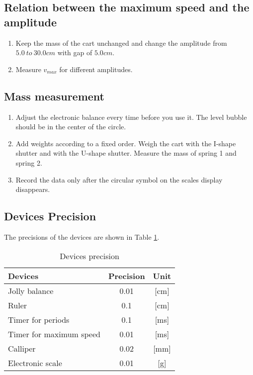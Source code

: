 \subsection{Relation between the maximum speed and the amplitude}
    \begin{enumerate}
        \item Keep the mass of the cart unchanged and change the amplitude from $5.0\ to\ 30.0 cm$ with gap of $5.0cm$.
        \item Measure $v_{max}$ for different amplitudes.
    \end{enumerate}

\subsection{Mass measurement}
    \begin{enumerate}
        \item Adjust the electronic balance every time before you use it. The level bubble should be in the center of the circle.
        \item Add weights according to a fixed order. Weigh the cart with the I-shape shutter and with the U-shape shutter. Measure the mass of spring 1 and spring 2.
        \item Record the data only after the circular symbol on the scales display disappears.
    \end{enumerate}

\subsection{Devices Precision}
    The precisions of the devices are shown in Table \ref{precision}.
    \begin{table}
        \centering
        \begin{tabular}{|l|c|c|}
            \hline
            Devices & Precision & Unit\\ \hline
            Jolly balance & 0.01 & [cm]\\ \hline
            Ruler & 0.1 & [cm]\\ \hline
            Timer for periods & 0.1 & [ms]\\ \hline
            Timer for maximum speed & 0.01 & [ms]\\ \hline
            Calliper & 0.02 & [mm]\\ \hline
            Electronic scale & 0.01 & [g]\\ \hline
        \end{tabular}
        \caption{Devices precision}\label{precision}
    \end{table}